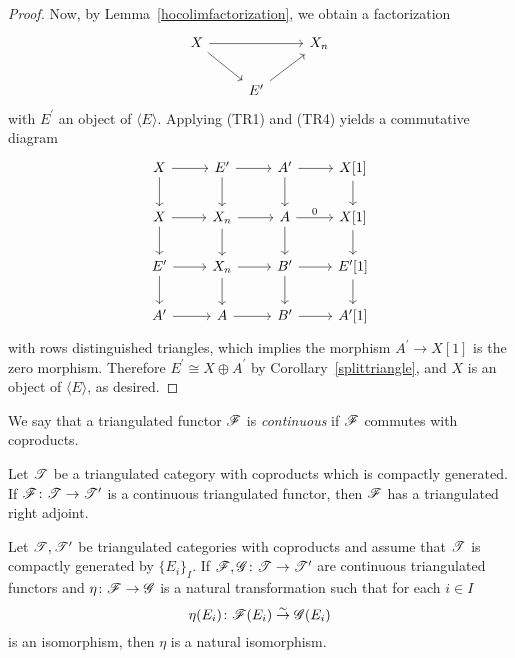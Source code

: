 \documentclass[dissertation.tex]{subfiles}
\begin{document}
\begin{prop}
\begin{proof}
    Now, by Lemma~\ref{hocolimfactorization}, we obtain a factorization
    $$\begin{tikzcd}
      X \arrow{rr}\arrow{rd} & & X_n\\
      & E^\prime \arrow{ur}
    \end{tikzcd}$$
    with $E^\prime$ an object of $\langle E \rangle$.
    Applying (TR1) and (TR4) yields a commutative diagram
    $$\begin{tikzcd}
      X \arrow{d}\arrow{r} & E^\prime \arrow{r}\arrow{d} & A^\prime \arrow{r}\arrow{d} & X[1]\arrow{d}\\
      X \arrow{r}\arrow{d} & X_n \arrow{r}\arrow{d} & A \arrow{r}{0}\arrow{d} & X[1]\arrow{d}\\
      E^\prime \arrow{r}\arrow{d} & X_n \arrow{r}\arrow{d} & B^\prime \arrow{r}\arrow{d} & E^\prime[1]\arrow{d}\\
      A^\prime \arrow{r} & A \arrow{r} & B^\prime \arrow{r} & A^\prime[1]
    \end{tikzcd}$$
    with rows distinguished triangles, which implies the morphism $A^\prime \rightarrow X[1]$ is the zero morphism.
    Therefore $E^\prime \cong X \oplus A^\prime$ by Corollary~\ref{splittriangle}, and $X$ is an object of $\langle E \rangle$, as desired.
  \end{proof}
\end{prop}

\begin{defn}
  We say that a triangulated functor $\mathscr{F}$ is {\it continuous} if $\mathscr{F}$ commutes with coproducts.
\end{defn}

\begin{prop}\label{brownrep}
  Let $\mathscr{T}$ be a triangulated category with coproducts which is compactly generated.
  If $\mathscr{F} \colon \mathscr{T} \to \mathscr{T}^\prime$ is a continuous triangulated functor, then $\mathscr{F}$ has a triangulated right adjoint.
\end{prop}

\begin{prop}\label{naturalisocontinuousfunctors}
  Let $\mathscr{T}, \mathscr{T}^\prime$ be triangulated categories with coproducts and assume that $\mathscr{T}$ is compactly generated by $\{E_i\}_I$.
  If $\mathscr{F}, \mathscr{G} \colon \mathscr{T} \to \mathscr{T}^\prime$ are continuous triangulated functors and $\eta \colon \mathscr{F} \to \mathscr{G}$ is a natural transformation such that for each $i \in I$ 
  $$\eta(E_i) \colon \mathscr{F}(E_i) \overset{\sim}\to \mathscr{G}(E_i)$$
  is an isomorphism, then $\eta$ is a natural isomorphism.
\end{prop}
\end{document}
